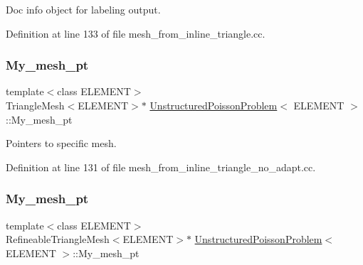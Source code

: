 Doc info object for labeling output. 



Definition at line 133 of file mesh\+\_\+from\+\_\+inline\+\_\+triangle.\+cc.

\mbox{\label{classUnstructuredPoissonProblem_a138fcf0adb978a7f3ae9e27ba6df900b}} 
\subsubsection{\texorpdfstring{My\+\_\+mesh\+\_\+pt}{My\_mesh\_pt}\hspace{0.1cm}{\footnotesize\ttfamily [1/2]}}
{\footnotesize\ttfamily template$<$class E\+L\+E\+M\+E\+NT$>$ \\
Triangle\+Mesh$<$E\+L\+E\+M\+E\+NT$>$$\ast$ \hyperlink{classUnstructuredPoissonProblem}{Unstructured\+Poisson\+Problem}$<$ E\+L\+E\+M\+E\+NT $>$\+::My\+\_\+mesh\+\_\+pt\hspace{0.3cm}{\ttfamily [private]}}



Pointers to specific mesh. 



Definition at line 131 of file mesh\+\_\+from\+\_\+inline\+\_\+triangle\+\_\+no\+\_\+adapt.\+cc.

\mbox{\label{classUnstructuredPoissonProblem_af95c713f5db16c288e307768b6bf9bb8}} 
\subsubsection{\texorpdfstring{My\+\_\+mesh\+\_\+pt}{My\_mesh\_pt}\hspace{0.1cm}{\footnotesize\ttfamily [2/2]}}
{\footnotesize\ttfamily template$<$class E\+L\+E\+M\+E\+NT$>$ \\
Refineable\+Triangle\+Mesh$<$E\+L\+E\+M\+E\+NT$>$$\ast$ \hyperlink{classUnstructuredPoissonProblem}{Unstructured\+Poisson\+Problem}$<$ E\+L\+E\+M\+E\+NT $>$\+::My\+\_\+mesh\+\_\+pt\hspace{0.3cm}{\ttfamily [private]}}



